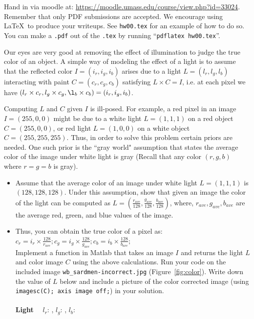 \documentclass[fleqn]{article}
\begin{document}


Hand in via moodle at: \url{https://moodle.umass.edu/course/view.php?id=33024}.
Remember that only PDF submissions are accepted.  We encourage using
\LaTeX\ to produce your writeups.  See \verb+hw00.tex+ for an example
of how to do so.  You can make a \verb+.pdf+ out of the \verb+.tex+ by
running ``\verb+pdflatex hw00.tex+''.

\vspace{0.2in}

Our eyes are very good at removing the effect of illumination to judge the true color of an object. A simple way of modeling the effect of a light is to assume that the reflected color $I = (i_r,i_g,i_b)$ arises due to a light $L= (l_r,l_g,l_b)$ interacting with paint $C = (c_r,c_g,c_b)$ satisfying  
	$L \times C = I$, i.e. at each pixel we have
	$(l_r \times c_r,l_g \times c_g ,\l_b \times c_b) = (i_r,i_g,i_b)$.

Computing $L$ and $C$ given $I$ is ill-posed. For example, a red pixel in an image $I=(255,0,0)$ might be due to a white light $L=(1,1,1)$ on a red object $C=(255,0,0)$, or red light $L=(1,0,0)$ on a white object $C=(255,255,255)$. Thus, in order to solve this problem certain priors are needed. One such prior is the ``gray world" assumption that states the average color of the image under white light is gray (Recall that any color $(r,g,b)$ where $r=g=b$ is gray). 

\begin{itemize}
\item Assume that the average color of an image under white light $L=(1,1,1)$ is $(128,128,128)$. Under this assumption, show that given an image the color of the light can be computed as 
	$ L = \left(\frac{r_{ave}}{128}, \frac{g_{ave}}{128}, \frac{b_{ave}}{128}\right)$, where, $r_{ave}, g_{ave}, b_{ave}$ are the average red, green, and blue values of the image. 

\item Thus, you can obtain the true color of a pixel as: $
	c_r = i_r \times \frac{128}{r_{ave}}; 
	c_g = i_g \times \frac{128}{g_{ave}}; 
	c_b = i_b \times \frac{128}{b_{ave}}; $\\
Implement a function in Matlab that takes an image $I$ and returns the light $L$ and color image $C$ using the above calculations. Run your code on the included image \texttt{wb\_sardmen-incorrect.jpg} (Figure~\ref{fig:color}).  Write down the value of $L$ below and include a picture of the color corrected image (using \texttt{imagesc(C); axis image off;}) in your solution.\\ \\
\textbf{Light}~~ $l_r$: \underline{\hspace{2cm}}, $l_g$: \underline{\hspace{3cm}}, $l_b$:\underline{\hspace{3cm}}
\end{itemize}
\end{document}
